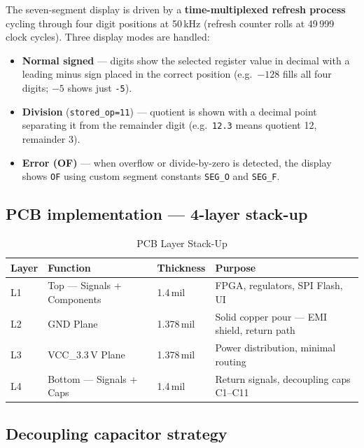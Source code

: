 \documentclass[11pt,a4paper]{article}
\begin{document}
The seven-segment display is driven by a \textbf{time-multiplexed refresh
process} cycling through four digit positions at 50\,kHz (refresh counter
rolls at 49\,999 clock cycles). Three display modes are handled:

\begin{itemize}[leftmargin=2em, noitemsep]
  \item \textbf{Normal signed} — digits show the selected register value in
        decimal with a leading minus sign placed in the correct position
        (e.g.\ $-128$ fills all four digits; $-5$ shows just \texttt{-5}).
  \item \textbf{Division} (\texttt{stored\_op=11}) — quotient is shown with
        a decimal point separating it from the remainder digit (e.g.\
        \texttt{12.3} means quotient 12, remainder 3).
  \item \textbf{Error (OF)} — when overflow or divide-by-zero is detected,
        the display shows \texttt{OF} using custom segment constants
        \texttt{SEG\_O} and \texttt{SEG\_F}.
\end{itemize}

\subsection{PCB implementation — 4-layer stack-up}

\begin{table}[H]
  \centering
  \caption{PCB Layer Stack-Up}
  \begin{tabularx}{\linewidth}{C{1cm}L{3cm}C{2.2cm}L{7cm}}
    \toprule
    \textbf{Layer} & \textbf{Function} & \textbf{Thickness} & \textbf{Purpose} \\
    \midrule
    L1 & Top — Signals + Components & 1.4\,mil   & FPGA, regulators, SPI Flash, UI \\
    L2 & GND Plane                  & 1.378\,mil & Solid copper pour — EMI shield, return path \\
    L3 & VCC\_3.3\,V Plane          & 1.378\,mil & Power distribution, minimal routing \\
    L4 & Bottom — Signals + Caps    & 1.4\,mil   & Return signals, decoupling caps C1–C11 \\
    \bottomrule
  \end{tabularx}
\end{table}

\subsection{Decoupling capacitor strategy}
\end{document}
